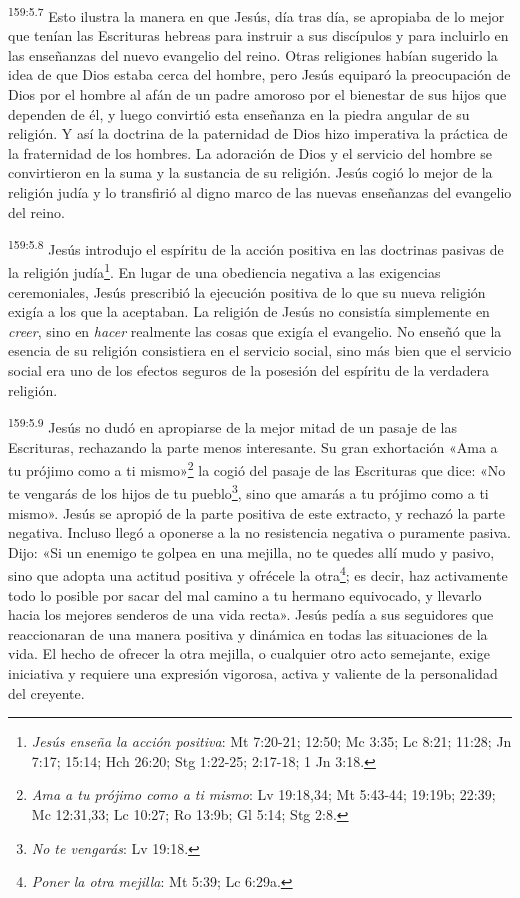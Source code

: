 \par
\textsuperscript{159:5.7} Esto ilustra la manera en que Jesús, día tras día, se apropiaba de lo mejor que tenían las Escrituras hebreas para instruir a sus discípulos y para incluirlo en las enseñanzas del nuevo evangelio del reino. Otras religiones habían sugerido la idea de que Dios estaba cerca del hombre, pero Jesús equiparó la preocupación de Dios por el hombre al afán de un padre amoroso por el bienestar de sus hijos que dependen de él, y luego convirtió esta enseñanza en la piedra angular de su religión. Y así la doctrina de la paternidad de Dios hizo imperativa la práctica de la fraternidad de los hombres. La adoración de Dios y el servicio del hombre se convirtieron en la suma y la sustancia de su religión. Jesús cogió lo mejor de la religión judía y lo transfirió al digno marco de las nuevas enseñanzas del evangelio del reino.

\par
\textsuperscript{159:5.8} Jesús introdujo el espíritu de la acción positiva en las doctrinas pasivas de la religión judía\footnote{\textit{Jesús enseña la acción positiva}: Mt 7:20-21; 12:50; Mc 3:35; Lc 8:21; 11:28; Jn 7:17; 15:14; Hch 26:20; Stg 1:22-25; 2:17-18; 1 Jn 3:18.}. En lugar de una obediencia negativa a las exigencias ceremoniales, Jesús prescribió la ejecución positiva de lo que su nueva religión exigía a los que la aceptaban. La religión de Jesús no consistía simplemente en \textit{creer}, sino en \textit{hacer} realmente las cosas que exigía el evangelio. No enseñó que la esencia de su religión consistiera en el servicio social, sino más bien que el servicio social era uno de los efectos seguros de la posesión del espíritu de la verdadera religión.

\par
\textsuperscript{159:5.9} Jesús no dudó en apropiarse de la mejor mitad de un pasaje de las Escrituras, rechazando la parte menos interesante. Su gran exhortación «Ama a tu prójimo como a ti mismo»\footnote{\textit{Ama a tu prójimo como a ti mismo}: Lv 19:18,34; Mt 5:43-44; 19:19b; 22:39; Mc 12:31,33; Lc 10:27; Ro 13:9b; Gl 5:14; Stg 2:8.} la cogió del pasaje de las Escrituras que dice: «No te vengarás de los hijos de tu pueblo\footnote{\textit{No te vengarás}: Lv 19:18.}, sino que amarás a tu prójimo como a ti mismo». Jesús se apropió de la parte positiva de este extracto, y rechazó la parte negativa. Incluso llegó a oponerse a la no resistencia negativa o puramente pasiva. Dijo: «Si un enemigo te golpea en una mejilla, no te quedes allí mudo y pasivo, sino que adopta una actitud positiva y ofrécele la otra\footnote{\textit{Poner la otra mejilla}: Mt 5:39; Lc 6:29a.}; es decir, haz activamente todo lo posible por sacar del mal camino a tu hermano equivocado, y llevarlo hacia los mejores senderos de una vida recta». Jesús pedía a sus seguidores que reaccionaran de una manera positiva y dinámica en todas las situaciones de la vida. El hecho de ofrecer la otra mejilla, o cualquier otro acto semejante, exige iniciativa y requiere una expresión vigorosa, activa y valiente de la personalidad del creyente.

